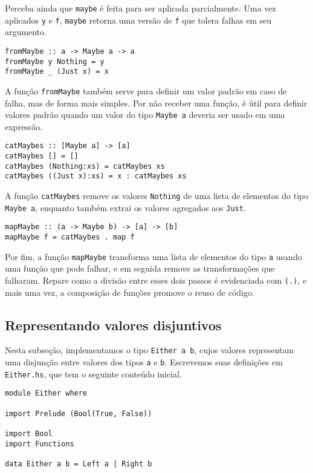 \documentclass[a4paper]{article}
\begin{document}
Perceba ainda que \texttt{maybe} é feita para ser aplicada parcialmente.
Uma vez aplicados \texttt{y} e \texttt{f}, \texttt{maybe} retorna uma versão de \texttt{f} que tolera falhas em seu argumento.

\begin{verbatim}
fromMaybe :: a -> Maybe a -> a
fromMaybe y Nothing = y
fromMaybe _ (Just x) = x
\end{verbatim}

A função \texttt{fromMaybe} também serve para definir um valor padrão em caso de falha, mas de forma mais simples.
Por não receber uma função, é útil para definir valores padrão quando um valor do tipo \texttt{Maybe a} deveria ser usado em uma expressão.

\begin{verbatim}
catMaybes :: [Maybe a] -> [a]
catMaybes [] = []
catMaybes (Nothing:xs) = catMaybes xs
catMaybes ((Just x):xs) = x : catMaybes xs
\end{verbatim}

A função \texttt{catMaybes} remove os valores \texttt{Nothing} de uma lista de elementos do tipo \texttt{Maybe a}, enquanto também extrai os valores agregados aos \texttt{Just}.

\begin{verbatim}
mapMaybe :: (a -> Maybe b) -> [a] -> [b]
mapMaybe f = catMaybes . map f
\end{verbatim}

Por fim, a função \texttt{mapMaybe} transforma uma lista de elementos do tipo \texttt{a} usando uma função que pode falhar, e em seguida remove as transformações que falharam.
Repare como a divisão entre esses dois passos é evidenciada com \texttt{(.)}, e mais uma vez, a composição de funções promove o reuso de código.

\subsection{Representando valores disjuntivos}

Nesta subseção, implementamos o tipo \texttt{Either a b}, cujos valores representam uma disjunção entre valores dos tipos \texttt{a} e \texttt{b}.
Escrevemos suas definições em \texttt{Either.hs}, que tem o seguinte conteúdo inicial.

\begin{verbatim}
module Either where

import Prelude (Bool(True, False))

import Bool
import Functions

data Either a b = Left a | Right b
\end{verbatim}
\end{document}
